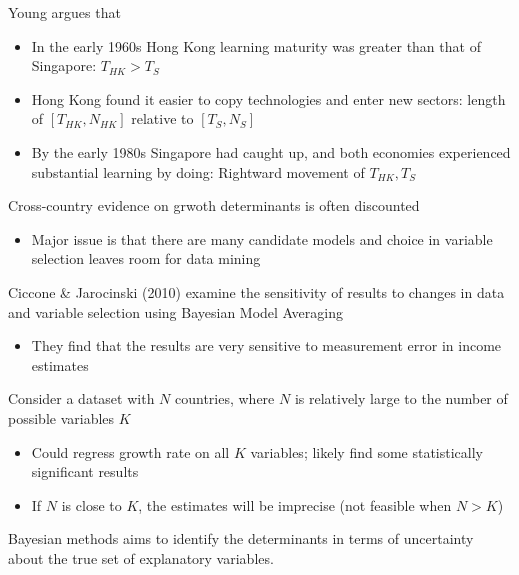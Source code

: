 \documentclass{beamer}
\begin{document}
\begin{frame}
  Young argues that
\begin{itemize}
  \item In the early 1960s Hong Kong learning maturity was greater than that of Singapore: $T_{HK}>T_S$
  \item Hong Kong found it easier to copy technologies and enter new sectors: length of $[T_{HK},N_{HK}]$ relative to $[T_{S},N_{S}]$
  \item By the early 1980s Singapore had caught up, and both economies experienced substantial learning by doing: Rightward movement of $T_{HK},T_S$  
\end{itemize}
\end{frame}

\begin{frame}
  Cross-country evidence on grwoth determinants is often discounted
  \begin{itemize}
    \item Major issue is that there are many candidate models and choice in variable selection leaves room for data mining
  \end{itemize}
  \medskip
  Ciccone \& Jarocinski (2010) examine the sensitivity of results to changes in data and variable selection using Bayesian Model Averaging
  \begin{itemize}
    \item They find that the results are very sensitive to measurement error in income estimates
  \end{itemize}  
\end{frame}

\begin{frame}
  Consider a dataset with $N$ countries, where $N$ is relatively large to the number of possible variables $K$
  \begin{itemize}
    \item Could regress growth rate on all $K$ variables; likely find some statistically significant results
    \item If $N$ is close to $K$, the estimates will be imprecise (not feasible when $N>K$)
  \end{itemize}
  \medskip
  Bayesian methods aims to identify the determinants in terms of uncertainty about the true set of explanatory variables. 
\end{frame}
\end{document}
